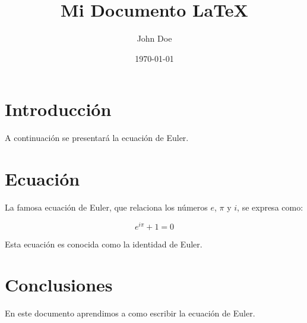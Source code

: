 \documentclass{article}
\title{Mi Documento LaTeX}
\author{John Doe}
\date{\today}
\begin{document}
\maketitle

\section{Introducción}

A continuación se presentará la ecuación de Euler.

\section{Ecuación}

La famosa ecuación de Euler, que relaciona los números $e$, $\pi$ y $i$, se expresa como:

\begin{equation}
    e^{i\pi} + 1 = 0
\end{equation}

Esta ecuación es conocida como la identidad de Euler.

\section{Conclusiones}

En este documento aprendimos a como escribir la ecuación de Euler.
\end{document}
